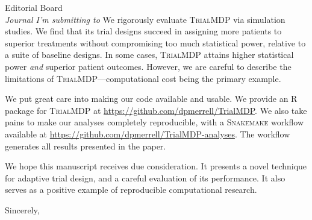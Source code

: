 \documentclass[12pt]{Myletter}
\begin{document}
\begin{letter}{
               Editorial Board\\ 
               \textit{Journal I'm submitting to}
               }
We rigorously evaluate \textsc{TrialMDP} via simulation studies.
We find that its trial designs succeed in assigning more patients to superior treatments without compromising too much statistical power, relative to a suite of baseline designs.
In some cases, \textsc{TrialMDP} attains higher statistical power \emph{and} superior patient outcomes.
However, we are careful to describe the limitations of \textsc{TrialMDP}---computational cost being the primary example.

We put great care into making our code available and usable.
We provide an \textsc{R} package for \textsc{TrialMDP} at \href{https://github.com/dpmerrell/TrialMDP}{https://github.com/dpmerrell/TrialMDP}.
We also take pains to make our analyses completely reproducible, with a \textsc{Snakemake} workflow available at \href{https://github.com/dpmerrell/TrialMDP-analyses}{https://github.com/dpmerrell/TrialMDP-analyses}.
The workflow generates all results presented in the paper.

We hope this manuscript receives due consideration.
It presents a novel technique for adaptive trial design, and a careful evaluation of its performance.
It also serves as a positive example of reproducible computational research.

\closing{Sincerely,}




\end{letter}
\end{document}
